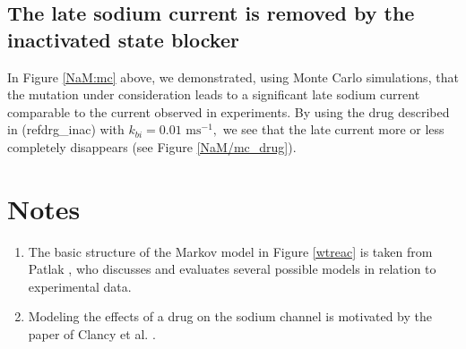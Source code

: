 \subsection{The late sodium current is removed by the inactivated state blocker}


In Figure \ref{NaM:mc} above, we demonstrated, using Monte Carlo simulations, that the
mutation under consideration leads to a significant late sodium current
comparable to the current observed in experiments. By using the drug described
in (ref{drg_inac}) with $k_{bi}=0.01 \text{ ms}^{-1},$ we see that the late
current more or less completely disappears (see Figure \ref{NaM/mc_drug}).



\section{Notes}

\begin{enumerate}
\item The basic structure of the Markov model in Figure \ref{wtreac} is taken 
from Patlak \cite{Patlak1991}, who discusses and evaluates several possible models in relation to experimental data.

\item Modeling the effects of a drug on the sodium channel is motivated by
the paper of Clancy et al. \cite{Clancy2007}.


\end{enumerate}






